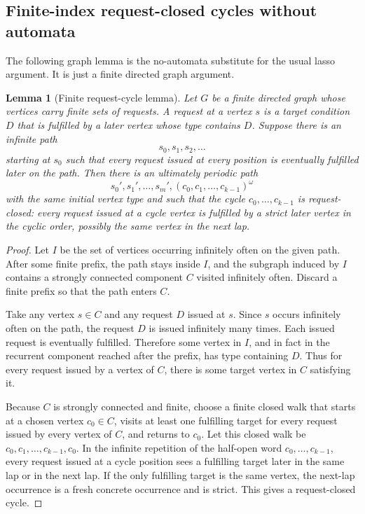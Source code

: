 \documentclass[11pt]{article}
\newtheorem{lemma}[theorem]{Lemma}
\begin{document}
\subsection{Finite-index request-closed cycles without automata}

The following graph lemma is the no-automata substitute for the usual lasso argument.  It is just a finite directed graph argument.

\begin{lemma}[Finite request-cycle lemma]\label{lem:finite-request-cycle}
Let $G$ be a finite directed graph whose vertices carry finite sets of requests.  A request at a vertex $s$ is a target condition $D$ that is fulfilled by a later vertex whose type contains $D$.  Suppose there is an infinite path
\[
   s_0,s_1,s_2,\ldots
\]
starting at $s_0$ such that every request issued at every position is eventually fulfilled later on the path.  Then there is an ultimately periodic path
\[
   s_0',s_1',\ldots,s_m',(c_0,c_1,\ldots,c_{k-1})^\omega
\]
with the same initial vertex type and such that the cycle $c_0,\ldots,c_{k-1}$ is request-closed: every request issued at a cycle vertex is fulfilled by a strict later vertex in the cyclic order, possibly the same vertex in the next lap.
\end{lemma}

\begin{proof}
Let $I$ be the set of vertices occurring infinitely often on the given path.  After some finite prefix, the path stays inside $I$, and the subgraph induced by $I$ contains a strongly connected component $C$ visited infinitely often.  Discard a finite prefix so that the path enters $C$.

Take any vertex $s\in C$ and any request $D$ issued at $s$.  Since $s$ occurs infinitely often on the path, the request $D$ is issued infinitely many times.  Each issued request is eventually fulfilled.  Therefore some vertex in $I$, and in fact in the recurrent component reached after the prefix, has type containing $D$.  Thus for every request issued by a vertex of $C$, there is some target vertex in $C$ satisfying it.

Because $C$ is strongly connected and finite, choose a finite closed walk that starts at a chosen vertex $c_0\in C$, visits at least one fulfilling target for every request issued by every vertex of $C$, and returns to $c_0$.  Let this closed walk be $c_0,c_1,\ldots,c_{k-1},c_0$.  In the infinite repetition of the half-open word $c_0,\ldots,c_{k-1}$, every request issued at a cycle position sees a fulfilling target later in the same lap or in the next lap.  If the only fulfilling target is the same vertex, the next-lap occurrence is a fresh concrete occurrence and is strict.  This gives a request-closed cycle.
\end{proof}
\end{document}
